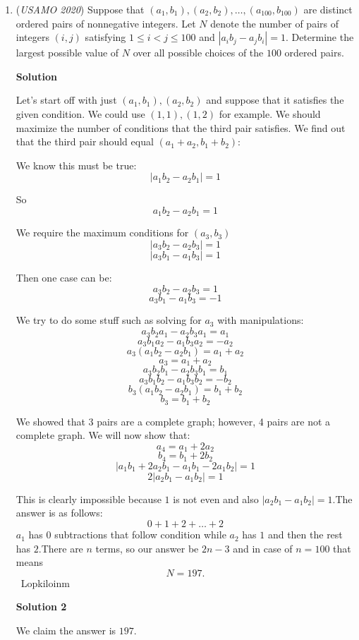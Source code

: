 \begin{enumerate}
 


	\item (\textit{USAMO 2020}) Suppose that $(a_1, b_1), (a_2, b_2), \ldots , (a_{100}, b_{100})$ are distinct ordered pairs of nonnegative integers. Let $N$ denote the number of pairs of integers $(i, j)$ satisfying $1 \le i < j \le 100$ and $|a_ib_j - a_j b_i|=1$. Determine the largest possible value of $N$ over all possible choices of the $100$ ordered pairs.


 



 



\textbf{Solution}

Let's start off with just $(a_1, b_1), (a_2, b_2)$ and suppose that it satisfies the given condition. We could use $(1, 1), (1, 2)$ for example. We should maximize the number of conditions that the third pair satisfies. We find out that the third pair should equal $(a_1+a_2, b_1+b_2)$:

 We know this must be true:
 \[|a_1b_2-a_2b_1| = 1\]

 So
 \[a_1b_2-a_2b_1 = 1\]

 We require the maximum conditions for $(a_3, b_3)$
 \[|a_3b_2-a_2b_3| = 1\]
 \[|a_3b_1-a_1b_3| = 1\]

 Then one case can be:
 \[a_3b_2-a_2b_3 = 1\]
 \[a_3b_1-a_1b_3 = -1\]

 We try to do some stuff such as solving for $a_3$ with manipulations:
 \[a_3b_2a_1-a_2b_3a_1 = a_1\]
 \[a_3b_1a_2-a_1b_3a_2 = -a_2\]
 \[a_3(a_1b_2-a_2b_1) = a_1+a_2\]
 \[a_3 = a_1+a_2\]
 \[a_3b_2b_1-a_2b_3b_1 = b_1\]
 \[a_3b_1b_2-a_1b_3b_2 = -b_2\]
 \[b_3(a_1b_2-a_2b_1) = b_1+b_2\]
 \[b_3 = b_1+b_2\]

 We showed that 3 pairs are a complete graph; however, 4 pairs are not a complete graph. We will now show that:
 \[a_4 = a_1+2a_2\]
 \[b_4 = b_1+2b_2\]
 \[|a_1b_1+2a_2b_1-a_1b_1-2a_1b_2| = 1\]
 \[2|a_2b_1-a_1b_2| = 1\]

 This is clearly impossible because $1$ is not even and also $|a_2b_1-a_1b_2| = 1$.The answer is as follows:
 \[0+1+2+\ldots+2\]$a_1$ has $0$ subtractions that follow condition while $a_2$ has $1$ and then the rest has $2$.There are $n$ terms, so our answer be $2n-3$ and in case of $n=100$ that means 
 \[\boxed{N=197}.\]~Lopkiloinm

 



\textbf{Solution 2}

We claim the answer is $197$. 


\end{enumerate}

